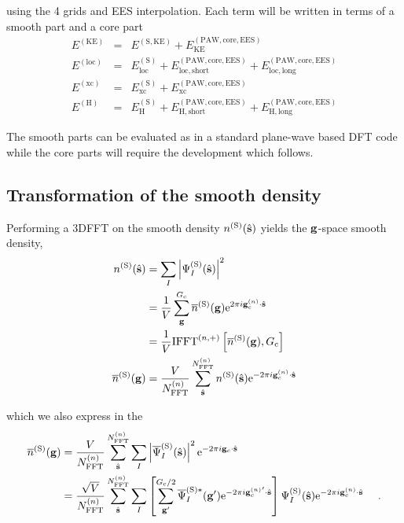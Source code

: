\documentclass[paper=a4, fontsize=11pt]{article} %
\numberwithin{equation}{section} %
\numberwithin{figure}{section} %
\numberwithin{table}{section} %
\newcommand{\ol}{\overline}
\newcommand{\bs}{{\bf{s}}}
\newcommand{\bg}{{\bf{g}}}
\newcommand{\rS}{{\mathrm{S}}}
\newcommand{\rKE}{{\mathrm{KE}}}
\newcommand{\rEES}{{\mathrm{EES}}}
\newcommand{\rxc}{{\mathrm{xc}}}
\newcommand{\rcore}{{\mathrm{core}}}
\newcommand{\re}{{\mathrm{e}}}
\newcommand{\rshort}{{\mathrm{short}}}
\newcommand{\rlong}{{\mathrm{long}}}
\newcommand{\rP}{{\mathrm{PAW}}}
\newcommand{\rH}{{\mathrm{H}}}
\newcommand{\rlo}{{\mathrm{loc}}}
\newcommand{\gc}{{\bg_c}}
\newcommand{\gcn}{{\bg_c^{(n)}}}
\newcommand{\igcs}{2\pi i\gc\cdot\hat \bs}
\newcommand{\igcns}{2\pi i\gcn\cdot\hat \bs}
\newcommand{\igpcns}{2\pi i\gcn'\cdot\hat \bs}
\newcommand{\NFFTn}{{N^{(n)}_{\mathrm{FFT}}}}
\newcommand{\Gc}{{G_{\mathrm{c}}}}
\newcommand{\IFFTn}{{\mathrm{IFFT}^{(n,+)}}}
\begin{document}
using the 4 grids and EES interpolation. Each term will be written in terms of a smooth part and a core part 
\begin{eqnarray}
E^{(\rKE)} &=& E^{(\rS,\rKE)} + E^{(\rP,\rcore,\rEES)}_{\rKE}\\
E^{(\rlo)} &=& E^{(\rS)}_{\rlo} + E^{(\rP,\rcore,\rEES)}_{\rlo,\rshort} + E^{(\rP,\rcore,\rEES)}_{\rlo,\rlong} \\
E^{(\rxc)} &=& E^{(\rS)}_{\rxc} + E^{(\rP,\rcore,\rEES)}_{\rxc}\\
E^{(\rH)} &=& E^{(\rS)}_{\rH} + E^{(\rP,\rcore,\rEES)}_{\rH,\rshort} + E^{(\rP,\rcore,\rEES)}_{\rH,\rlong}
\end{eqnarray}

The smooth parts can be evaluated as in a standard plane-wave based DFT code while the core parts will require the development which follows.\\

\subsection{Transformation of the smooth density}
Performing a 3DFFT on the smooth density $n^{(\rS)}(\hat \bs)$ yields the $\bg$-space smooth density,
\begin{equation} \label{eq:nSg}
\begin{split}
n^{(\rS)}(\hat \bs)
&= \sum_I \left|\Psi_I^{(\rS)}(\hat \bs) \right|^2 \\
&= \frac{1}{V}\sum_{\bg}^{\Gc} \ol{n}^{(\rS)}(\bg)\re^{\igcns} \\
&= \frac{1}{V}\IFFTn\left[\ol{n}^{(\rS)}(\bg),\Gc\right]\\
\overline{n}^{(\rS)}(\bg) 
&=\frac{V}{\NFFTn}\sum_{\hat \bs}^{\NFFTn} n^{(\rS)}(\hat \bs) \re^{-\igcns} \\
\end{split}
\end{equation}

which we also express in the
\begin{equation} 
\begin{split}
\overline{n}^{(\rS)}(\bg) 
&= \frac{V}{\NFFTn}\sum_{\hat\bs}^{\NFFTn}  \sum_I \left| \overline \Psi_I^{(\rS)}(\hat \bs) \right|^2  \re^{-\igcs} \\
&= \frac{\sqrt V}{\NFFTn} \sum_{\hat\bs}^{\NFFTn}  \sum_I  \left[\sum_{\bg'}^{\Gc/2} \overline{\Psi}_I^{(\rS)*}(\bg')  \re^{-\igpcns}\right] \Psi_I^{(\rS)}(\hat \bs) \re^{-\igcns}\ \ \ \ . \\
\end{split}
\end{equation}
\end{document}
